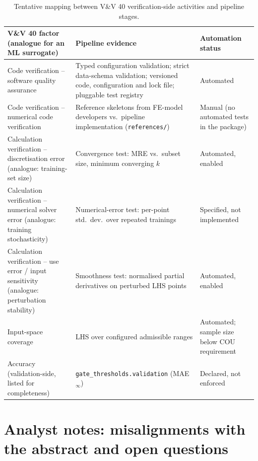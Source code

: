 \begin{table}[htbp]
  \centering
  \caption{Tentative mapping between V\&V 40 verification-side activities and
    pipeline stages.}
  \label{tab:vv40}
  \small
  \begin{tabular}{p{3.4cm}p{5.2cm}p{4.6cm}}
    \toprule
    V\&V 40 factor (analogue for an ML surrogate) & Pipeline evidence & Automation status \\
    \midrule
    Code verification -- software quality assurance &
      Typed configuration validation; strict data-schema validation; versioned code, configuration and lock file; pluggable test registry &
      Automated \\
    Code verification -- numerical code verification &
      Reference skeletons from FE-model developers vs.\ pipeline implementation (\texttt{references/}) &
      Manual (no automated tests in the package) \\
    Calculation verification -- discretisation error (analogue: training-set size) &
      Convergence test: MRE vs.\ subset size, minimum converging $k$ &
      Automated, enabled \\
    Calculation verification -- numerical solver error (analogue: training stochasticity) &
      Numerical-error test: per-point std.\ dev.\ over repeated trainings &
      Specified, not implemented \\
    Calculation verification -- use error / input sensitivity (analogue: perturbation stability) &
      Smoothness test: normalised partial derivatives on perturbed LHS points &
      Automated, enabled \\
    Input-space coverage &
      LHS over configured admissible ranges &
      Automated; sample size below COU requirement \\
    Accuracy (validation-side, listed for completeness) &
      \texttt{gate\_thresholds.validation} (MAE$_\infty$) &
      Declared, not enforced \\
    \bottomrule
  \end{tabular}
\end{table}

\section*{Analyst notes: misalignments with the abstract and open questions}
\label{sec:notes}


